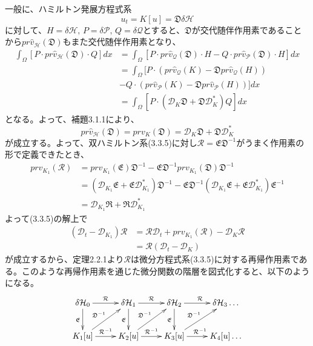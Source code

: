 \documentclass[a4paper, 11pt]{report}
\theoremstyle{definition}
\begin{document}
 一般に、ハミルトン発展方程式系
\begin{equation*}
u_t = K[u] = \mathfrak{D}\delta\mathcal{H}
\end{equation*}
に対して、$H=\delta\mathcal{H}, \, P=\delta\mathcal{P}, \, Q=\delta\mathcal{Q}$とすると、$\mathfrak{D}$が交代随伴作用素であることから$pr\hat{v}_\mathcal{H}(\mathfrak{D})$もまた交代随伴作用素となり、
\begin{align*}
\int_\Omega [P\cdot pr\hat{v}_\mathcal{H}(\mathfrak{D})\cdot Q]dx &= \int_\Omega [P\cdot pr\hat{v}_\mathcal{Q}(\mathfrak{D})\cdot H - Q\cdot pr\hat{v}_\mathcal{P}(\mathfrak{D})\cdot H]dx\\
&= \int_\Omega [P\cdot (pr\hat{v}_\mathcal{Q}(K)-\mathfrak{D}pr\hat{v}_\mathcal{Q}(H))\\
&- Q\cdot (pr\hat{v}_\mathcal{P}(K)-\mathfrak{D}pr\hat{v}_\mathcal{P}(H))]dx\\
&= \int_\Omega [P\cdot (\mathcal{D}_K\mathfrak{D}+\mathfrak{D}\mathcal{D}_{K}^*)Q]dx
\end{align*}
となる。よって、補題3.1.1により、
\begin{equation}
pr\hat{v}_\mathcal{H}(\mathfrak{D}) = prv_K(\mathfrak{D}) = \mathcal{D}_K\mathfrak{D}+\mathfrak{D}\mathcal{D}_{K}^*  %
\end{equation}
が成立する。よって、双ハミルトン系(3.3.5)に対し$\mathcal{R}=\mathfrak{E}\mathfrak{D}^{-1}$がうまく作用素の形で定義できたとき、
\begin{align*}
prv_{K_1}(\mathcal{R}) &= prv_{K_1}(\mathfrak{E})\mathfrak{D}^{-1}-\mathfrak{E}\mathfrak{D}^{-1}prv_{K_1}(\mathfrak{D})\mathfrak{D}^{-1}\\
&= (\mathcal{D}_{K_1}\mathfrak{E}+\mathfrak{E}\mathcal{D}_{K_1}^*)\mathfrak{D}^{-1}-\mathfrak{E}\mathfrak{D}^{-1}(\mathcal{D}_{K_1}\mathfrak{E}+\mathfrak{E}\mathcal{D}_{K_1}^*)\mathfrak{E}^{-1}\\
&= \mathcal{D}_{K_1}\mathfrak{R}+\mathfrak{R}\mathcal{D}_{K_1}^*
\end{align*}
よって(3.3.5)の解上で
\begin{align*}
(\mathcal{D}_t-\mathcal{D}_{K_1})\mathcal{R} &= \mathcal{R}\mathcal{D}_t+prv_{K_1}(\mathcal{R})-\mathcal{D}_K\mathcal{R}\\
&= \mathcal{R}(\mathcal{D}_t-\mathcal{D}_K)
\end{align*}
が成立するから、定理2.2.1より$\mathcal{R}$は微分方程式系(3.3.5)に対する再帰作用素である。このような再帰作用素を通じた微分関数の階層を図式化すると、以下のようになる。
\begin{align*}
\xymatrix{
{\delta \mathcal{H}_0} \ar[r]^{\mathcal{R}} \ar[d]_{\mathfrak{E}} & {\delta \mathcal{H}_1} \ar[r]^{\mathcal{R}} \ar[d]_{\mathfrak{E}} & {\delta \mathcal{H}_2} \ar[r]^{\mathcal{R}} \ar[d]_{\mathfrak{E}} & {\delta \mathcal{H}_3} \dots\\
K_1[u] \ar[r]^{\mathcal{R}^{-1}} \ar[ur]^{\mathfrak{D}^{-1}} & K_2[u] \ar[r]^{\mathcal{R}^{-1}} \ar[ur]^{\mathfrak{D}^{-1}} & K_3[u] \ar[r]^{\mathcal{R}^{-1}} \ar[ur]^{\mathfrak{D}^{-1}} & K_4[u] \dots
}
\end{align*}
\end{document}
